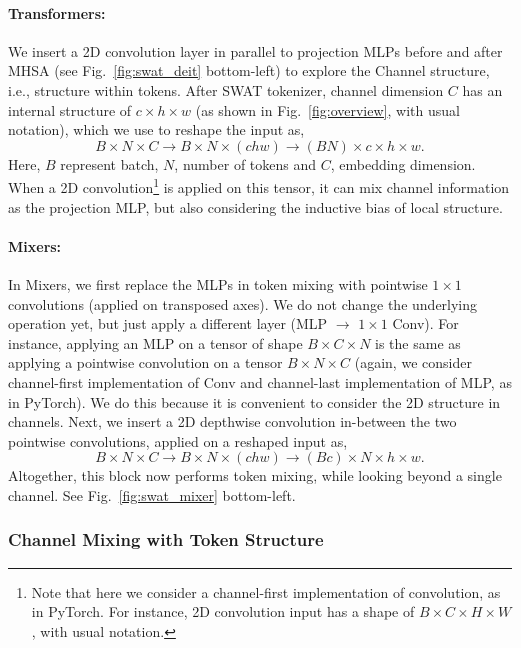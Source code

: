\documentclass[10pt,twocolumn,letterpaper]{article}
\newcommand{\fref}[1]{Fig.~\ref{#1}}
\begin{document}
\paragraph{Transformers:} We insert a 2D convolution layer in parallel to projection MLPs before and after MHSA (see \fref{fig:swat_deit} bottom-left) to explore the Channel structure, i.e., structure within tokens. After SWAT tokenizer, channel dimension $C$ has an internal structure of $c\times h\times w$ (as shown in \fref{fig:overview}, with usual notation), which we use to reshape the input as,
\begin{equation*}
	B\times N\times C \rightarrow B\times N\times (chw) \rightarrow (BN)\times c\times h\times w.
\end{equation*}
\noindent Here, $B$ represent batch, $N$, number of tokens and $C$, embedding dimension. When a 2D convolution\footnote{Note that here we consider a channel-first implementation of convolution, as in PyTorch. For instance, 2D convolution input has a shape of $B\times C\times H\times W$, with usual notation.} is applied on this tensor, it can mix channel information as the projection MLP, but also considering the inductive bias of local structure.


\paragraph{Mixers:} In Mixers, we first replace the MLPs in token mixing with pointwise $1\times1$ convolutions (applied on transposed axes). We do not change the underlying operation yet, but just apply a different layer (MLP $\rightarrow$ $1\times1$ Conv). For instance, applying an MLP on a tensor of shape $B\times C\times N$ is the same as applying a pointwise convolution on  a tensor $B\times N\times C$ (again, we consider channel-first implementation of Conv and channel-last implementation of MLP, as in PyTorch). We do this because it is convenient to consider the 2D structure in channels. Next, we insert a 2D depthwise convolution in-between the two pointwise convolutions, applied on a reshaped input as,
\begin{equation*}
	B\times N\times C \rightarrow B\times N\times (chw) \rightarrow (Bc)\times N\times h\times w.
\end{equation*}
\noindent Altogether, this block now performs token mixing, while looking beyond a single channel. See \fref{fig:swat_mixer} bottom-left.

\subsubsection{Channel Mixing with Token Structure}
\end{document}
